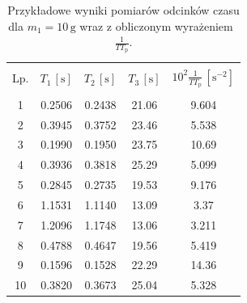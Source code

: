 \begin{table}[h]
\begin{center}
\renewcommand*{\tablename}{Tabela}
\caption{\small Przykładowe wyniki pomiarów odcinków czasu dla $m_1 = 10 \, \mathrm{g}$ wraz z obliczonym wyrażeniem~$\frac{1}{T T_{\mathrm{p}}}$.\vspace{0.15cm}
    \label{tab:pomiary_czas_10g}}
    {\small
    \begin{tabular}{c c c c c}
    \hline \vspace{-0.35cm} \\
      Lp. & $T_1\,[\mathrm{s}]$ & $T_2\,[\mathrm{s}]$ & $T_3\,[\mathrm{s}]$ & $10^2 \frac{1}{T T_{\mathrm{p}}}\,[\mathrm{s}^{-2}]$ \\ 
      \hline \vspace{-0.2cm} \\
     1 & 0.2506 & 0.2438 & 21.06 & 9.604 \\
     2 & 0.3945 & 0.3752 & 23.46 & 5.538 \\
     3 & 0.1990 & 0.1950 & 23.75 & 10.69 \\
     4 & 0.3936 & 0.3818 & 25.29 & 5.099 \\
     5 & 0.2845 & 0.2735 & 19.53 & 9.176 \\
     6 & 1.1531 & 1.1140 & 13.09 & 3.37 \\
     7 & 1.2096 & 1.1748 & 13.06 & 3.211 \\
     8 & 0.4788 & 0.4647 & 19.56 & 5.419 \\
     9 & 0.1596 & 0.1528 & 22.29 & 14.36 \\
     10 & 0.3820 & 0.3673 & 25.04 & 5.328 \\
    \hline
    \end{tabular}}
    \end{center}
\end{table}
